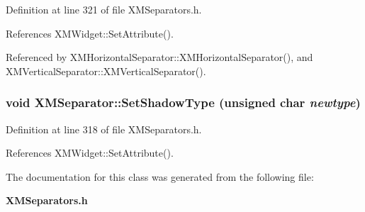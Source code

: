 Definition at line 321 of file XMSeparators.h.

References XMWidget::Set\-Attribute().

Referenced by XMHorizontal\-Separator::XMHorizontal\-Separator(), and XMVertical\-Separator::XMVertical\-Separator().
\subsubsection{\setlength{\rightskip}{0pt plus 5cm}void XMSeparator::Set\-Shadow\-Type (unsigned char {\em newtype})\hspace{0.3cm}{\tt  [inline]}}\label{classXMSeparator_a4}




Definition at line 318 of file XMSeparators.h.

References XMWidget::Set\-Attribute().

The documentation for this class was generated from the following file:\begin{CompactItemize}
\item 
{\bf XMSeparators.h}\end{CompactItemize}
